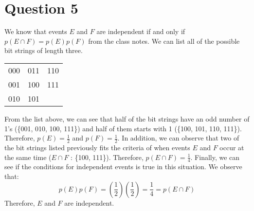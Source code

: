 \documentclass[letterpaper, 12pt]{article}
\begin{document}
\section*{Question 5}
We know that events $E$ and $F$ are independent if and only if $p(E \cap F) = p(E)p(F)$ from the class notes. We can list all of the possible bit strings of length three.
\vspace{-0.5em}
\setlength{\tabcolsep}{16pt}
\begin{table}[H]
    \begin{tabular}{c c c}
         000 & 011 & 110 \\
         001 & 100 & 111 \\
         010 & 101 & \\
    \end{tabular}
\end{table}
\vspace{-1.5em}
From the list above, we can see that half of the bit strings have an odd number of 1's (\{001, 010, 100, 111\}) and half of them starts with 1 (\{100, 101, 110, 111\}). Therefore, $p(E) = \frac{1}{2}$ and $p(F) = \frac{1}{2}$. In addition, we can observe that two of the bit strings listed previously fits the criteria of when events $E$ and $F$ occur at the same time ($E \cap F$ : \{100, 111\}). Therefore, $p(E \cap F) = \frac{1}{4}$. Finally, we can see if the conditions for independent events is true in this situation. We observe that:
\[p(E)p(F) = \left(\frac{1}{2}\right)\left(\frac{1}{2}\right) = \frac{1}{4} = p(E \cap F)\]
Therefore, $E$ and $F$ are independent.
\end{document}
